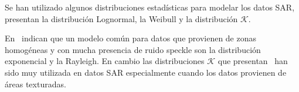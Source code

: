 
Se han utilizado algunos distribuciones estadísticas para modelar los datos SAR,~\citet{Lee2009} presentan la distribución Lognormal, la Weibull y la distribución $\mathcal{K}$. 

En~\citet{Frery97} indican que un modelo común para datos que provienen de zonas homogéneas y con mucha presencia de ruido speckle son la distribución exponencial y la Rayleigh. En cambio las distribuciones $\mathcal{K}$ que presentan~\citet{Jakeman87} han sido muy utilizada en datos SAR especialmente cuando los datos provienen de áreas texturadas. 

